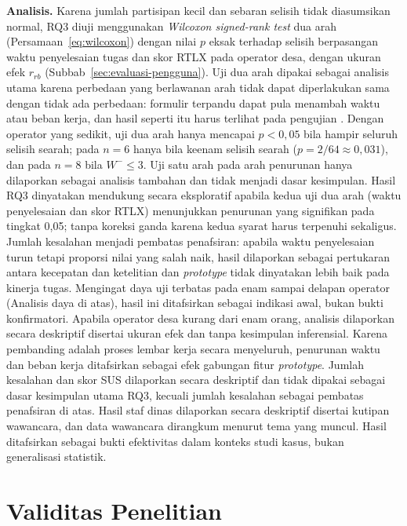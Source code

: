 \textbf{Analisis.} Karena jumlah partisipan kecil dan sebaran selisih tidak diasumsikan normal, RQ3 diuji menggunakan \textit{Wilcoxon signed-rank test} dua arah \cite{wilcoxon1945individual,rainio2024evaluation} (Persamaan~\eqref{eq:wilcoxon}) dengan nilai $p$ eksak terhadap selisih berpasangan waktu penyelesaian tugas dan skor RTLX pada operator desa, dengan ukuran efek $r_{rb}$ (Subbab~\ref{sec:evaluasi-pengguna}). Uji dua arah dipakai sebagai analisis utama karena perbedaan yang berlawanan arah tidak dapat diperlakukan sama dengan tidak ada perbedaan: formulir terpandu dapat pula menambah waktu atau beban kerja, dan hasil seperti itu harus terlihat pada pengujian \cite{bland1994onetwosided}. Dengan operator yang sedikit, uji dua arah hanya mencapai $p < 0{,}05$ bila hampir seluruh selisih searah; pada $n = 6$ hanya bila keenam selisih searah ($p = 2/64 \approx 0{,}031$), dan pada $n = 8$ bila $W^{-} \leq 3$. Uji satu arah pada arah penurunan hanya dilaporkan sebagai analisis tambahan dan tidak menjadi dasar kesimpulan. Hasil RQ3 dinyatakan mendukung secara eksploratif apabila kedua uji dua arah (waktu penyelesaian dan skor RTLX) menunjukkan penurunan yang signifikan pada tingkat 0,05; tanpa koreksi ganda karena kedua syarat harus terpenuhi sekaligus. Jumlah kesalahan menjadi pembatas penafsiran: apabila waktu penyelesaian turun tetapi proporsi nilai yang salah naik, hasil dilaporkan sebagai pertukaran antara kecepatan dan ketelitian dan \textit{prototype} tidak dinyatakan lebih baik pada kinerja tugas. Mengingat daya uji terbatas pada enam sampai delapan operator (Analisis daya di atas), hasil ini ditafsirkan sebagai indikasi awal, bukan bukti konfirmatori. Apabila operator desa kurang dari enam orang, analisis dilaporkan secara deskriptif disertai ukuran efek dan tanpa kesimpulan inferensial. Karena pembanding adalah proses lembar kerja secara menyeluruh, penurunan waktu dan beban kerja ditafsirkan sebagai efek gabungan fitur \textit{prototype}. Jumlah kesalahan dan skor SUS dilaporkan secara deskriptif dan tidak dipakai sebagai dasar kesimpulan utama RQ3, kecuali jumlah kesalahan sebagai pembatas penafsiran di atas. Hasil staf dinas dilaporkan secara deskriptif disertai kutipan wawancara, dan data wawancara dirangkum menurut tema yang muncul. Hasil ditafsirkan sebagai bukti efektivitas dalam konteks studi kasus, bukan generalisasi statistik.

\section{Validitas Penelitian}
\label{sec:validitas}

